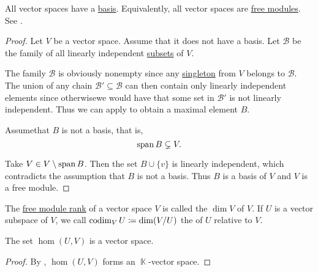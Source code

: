 \begin{theorem}\label{thm:all_vector_spaces_are_free_left_modules}
  All vector spaces have a \hyperref[def:left_module_hamel_basis]{basis}. Equivalently, all vector spaces are \hyperref[def:free_left_module]{free modules}. See .
\end{theorem}
\begin{proof}
  Let \( V \) be a vector space. Assume that it does not have a basis. Let \( \mathcal{B} \) be the family of all linearly independent \hyperref[def:linear_combination]{subsets} of \( V \).

  The family \( \mathcal{B} \) is obviously nonempty since any \hyperref[rem:singleton_sets]{singleton} from \( V \) belongs to \( \mathcal{B} \). The union of any chain \( \mathcal{B}' \subseteq \mathcal{B} \) can then contain only linearly independent elements since otherwise\LEM we would have that some set in \( \mathcal{B}' \) is not linearly independent. Thus we can apply  to obtain a maximal element \( B \).

  Assume\LEM that \( B \) is not a basis, that is,
  \begin{equation*}
    \operatorname{span} B \subsetneq V.
  \end{equation*}

  Take \( V \in V \setminus \operatorname{span} B \). Then the set \( B \cup \{ v \} \) is linearly independent, which contradicts the assumption that \( B \) is not a basis. Thus \( B \) is a basis of \( V \) and \( V \) is a free module.
\end{proof}

\begin{definition}\label{def:vector_space_dimension}
  The \hyperref[def:free_left_module]{free module rank} of a vector space \( V \) is called the  \( \dim V \) of \( V \). If \( U \) is a vector subspace of \( V \), we call \( \operatorname{co}\!\dim_V U \coloneqq \dim(V/U) \) the  of \( U \) relative to \( V \).
\end{definition}

\begin{proposition}\label{thm:linear_maps_form_algebra}
  The set \( \hom(U, V) \) is a vector space.
\end{proposition}
\begin{proof}
  By , \( \hom(U, V) \) forms an \( \BbbK \)-vector space.
\end{proof}


